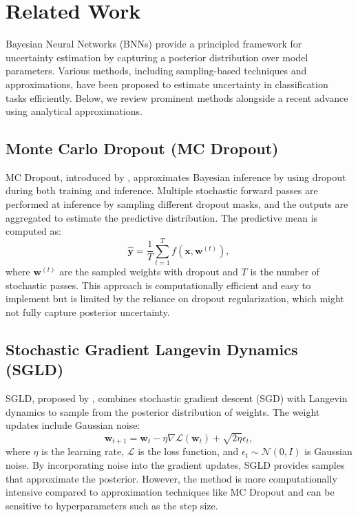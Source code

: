 \documentclass{article}
\begin{document}
\section{Related Work}\label{sec:related_work}
Bayesian Neural Networks (BNNs) provide a principled framework for uncertainty estimation by capturing a posterior distribution over model parameters. Various methods, including sampling-based techniques and approximations, have been proposed to estimate uncertainty in classification tasks efficiently. Below, we review prominent methods alongside a recent advance using analytical approximations.

\subsection{Monte Carlo Dropout (MC Dropout)}
MC Dropout, introduced by \cite{gal16}, approximates Bayesian inference by using dropout during both training and inference. Multiple stochastic forward passes are performed at inference by sampling different dropout masks, and the outputs are aggregated to estimate the predictive distribution. The predictive mean is computed as:
$$
\hat{\mathbf{y}} = \frac{1}{T} \sum_{t=1}^{T} f(\mathbf{x}, \mathbf{w}^{(t)}),
$$
where  $\mathbf{w}^{(t)}$  are the sampled weights with dropout and  $T$  is the number of stochastic passes. This approach is computationally efficient and easy to implement but is limited by the reliance on dropout regularization, which might not fully capture posterior uncertainty.

\subsection{Stochastic Gradient Langevin Dynamics (SGLD)}
SGLD, proposed by \cite{well11}, combines stochastic gradient descent (SGD) with Langevin dynamics to sample from the posterior distribution of weights. The weight updates include Gaussian noise:
$$
\mathbf{w}_{t+1} = \mathbf{w}_t - \eta \nabla \mathcal{L}(\mathbf{w}_t) + \sqrt{2\eta} \epsilon_t,
$$
where  $\eta$  is the learning rate,  $\mathcal{L}$  is the loss function, and  $\epsilon_t \sim \mathcal{N}(0, I)$  is Gaussian noise. By incorporating noise into the gradient updates, SGLD provides samples that approximate the posterior. However, the method is more computationally intensive compared to approximation techniques like MC Dropout and can be sensitive to hyperparameters such as the step size.
\end{document}
